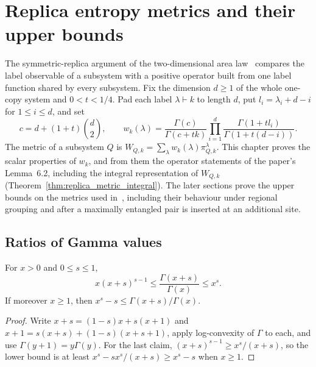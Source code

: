 
\chapter{Replica entropy metrics and their upper bounds}\label{ch:replica_metrics}

The symmetric-replica argument of the two-dimensional area
law~\cite{OpenAI2026AreaLaw} compares the label observable of a subsystem with
a positive operator built from one label function shared by every subsystem.
Fix the dimension $d\ge1$ of the whole one-copy system and $0<t<1/4$. Pad each
label $\lambda\vdash k$ to length $d$, put $l_i=\lambda_i+d-i$ for
$1\le i\le d$, and set
\[
    c=d+(1+t)\binom d2,\qquad
    w_k(\lambda)=\frac{\Gamma(c)}{\Gamma(c+tk)}
        \prod_{i=1}^d\frac{\Gamma(1+tl_i)}{\Gamma(1+t(d-i))}.
\]
The metric of a subsystem $Q$ is $W_{Q,k}=\sum_\lambda w_k(\lambda)\pi^\lambda_{Q,k}$.
This chapter proves the scalar properties of $w_k$, and from them the operator
statements of the paper's Lemma~6.2, including the integral representation of
$W_{Q,k}$ (Theorem~\ref{thm:replica_metric_integral}). The later sections
prove the upper bounds on the metrics used in~\cite{OpenAI2026AreaLaw},
including their behaviour under regional grouping and after a maximally
entangled pair is inserted at an additional site.

\section{Ratios of Gamma values}

\begin{lemma}
    \label{lem:wendel_gamma_ratio}
    \leanok
    For $x>0$ and $0\le s\le1$,
    \[
        x(x+s)^{s-1}\le\frac{\Gamma(x+s)}{\Gamma(x)}\le x^s .
    \]
    If moreover $x\ge1$, then $x^s-s\le\Gamma(x+s)/\Gamma(x)$.
\end{lemma}

\begin{proof}\leanok
    Write $x+s=(1-s)x+s(x+1)$ and $x+1=s(x+s)+(1-s)(x+s+1)$, apply
    log-convexity of $\Gamma$ to each, and use $\Gamma(y+1)=y\Gamma(y)$. For
    the last claim, $(x+s)^{s-1}\ge x^s/(x+s)$, so the lower bound is at least
    $x^s-sx^s/(x+s)\ge x^s-s$ when $x\ge1$.
\end{proof}

